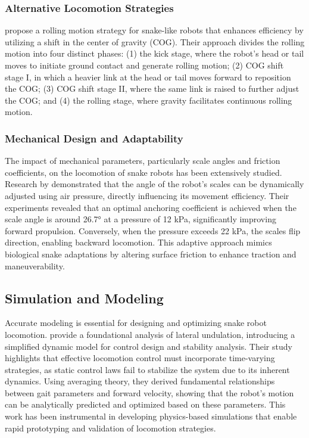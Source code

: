 \documentclass[12pt,a4paper]{report}
\begin{document}
\subsubsection{Alternative Locomotion Strategies}
\textcite{yamano-2023} propose a rolling motion strategy for snake-like robots that enhances efficiency by utilizing a shift in the center of gravity (COG). Their approach divides the rolling motion into four distinct phases: (1) the kick stage, where the robot’s head or tail moves to initiate ground contact and generate rolling motion; (2) COG shift stage I, in which a heavier link at the head or tail moves forward to reposition the COG; (3) COG shift stage II, where the same link is raised to further adjust the COG; and (4) the rolling stage, where gravity facilitates continuous rolling motion.

\subsubsection{Mechanical Design and Adaptability}
The impact of mechanical parameters, particularly scale angles and friction coefficients, on the locomotion of snake robots has been extensively studied. Research by \textcite{shen-2021} demonstrated that the angle of the robot’s scales can be dynamically adjusted using air pressure, directly influencing its movement efficiency. Their experiments revealed that an optimal anchoring coefficient is achieved when the scale angle is around 26.7° at a pressure of 12 kPa, significantly improving forward propulsion. Conversely, when the pressure exceeds 22 kPa, the scales flip direction, enabling backward locomotion. This adaptive approach mimics biological snake adaptations by altering surface friction to enhance traction and maneuverability.

\subsection{Simulation and Modeling}
Accurate modeling is essential for designing and optimizing snake robot locomotion. \textcite{liljeback-2013} provide a foundational analysis of lateral undulation, introducing a simplified dynamic model for control design and stability analysis. Their study highlights that effective locomotion control must incorporate time-varying strategies, as static control laws fail to stabilize the system due to its inherent dynamics. Using averaging theory, they derived fundamental relationships between gait parameters and forward velocity, showing that the robot’s motion can be analytically predicted and optimized based on these parameters. This work has been instrumental in developing physics-based simulations that enable rapid prototyping and validation of locomotion strategies.
\end{document}
